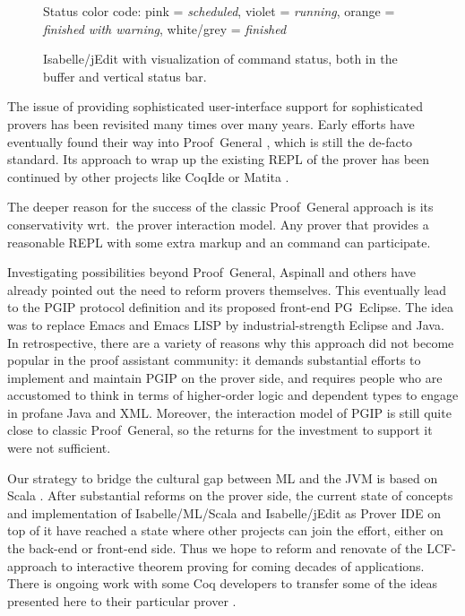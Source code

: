 \begin{isabellebody}
\begin{isamarkuptext}
\begin{figure}[htb]
  {\small Status color code: pink = \emph{scheduled}, violet =
  \emph{running}, orange = \emph{finished with warning}, white/grey =
  \emph{finished}}

  \caption{Isabelle/jEdit with visualization of command status, both
  in the buffer and vertical status bar.}\label{fig:parallel_status}

  \end{figure}

  The issue of providing sophisticated user-interface support for
  sophisticated provers has been revisited many times over many years.
  Early efforts \cite{Bertot-Thery:1998} have eventually found their
  way into Proof~General \cite{Aspinall:TACAS:2000}, which is still
  the de-facto standard.  Its approach to wrap up the existing REPL of
  the prover has been continued by other projects like CoqIde
  \cite[\S4]{Wiedijk:2006} or Matita \cite{Asperti-et-al:2007}.

  The deeper reason for the success of the classic Proof~General
  approach is its conservativity wrt.\ the prover interaction model.
  Any prover that provides a reasonable REPL with some extra markup
  and an \isa{{\isasymUNDO}} command can participate.

  Investigating possibilities beyond Proof~General, Aspinall and
  others have already pointed out the need to reform provers
  themselves.  This eventually lead to the PGIP protocol definition
  \cite{Aspinall-et-al:2007} and its proposed front-end PG~Eclipse.
  The idea was to replace Emacs and Emacs LISP by industrial-strength
  Eclipse and Java.  In retrospective, there are a variety of reasons
  why this approach did not become popular in the proof assistant
  community: it demands substantial efforts to implement and maintain
  PGIP on the prover side, and requires people who are accustomed to
  think in terms of higher-order logic and dependent types to engage
  in profane Java and XML.  Moreover, the interaction model of PGIP is
  still quite close to classic Proof~General, so the returns for the
  investment to support it were not sufficient.

  \medskip Our strategy to bridge the cultural gap between ML and the
  JVM is based on Scala \cite{Scala:2004}.  After substantial reforms
  on the prover side, the current state of concepts and implementation
  of Isabelle/ML/Scala and Isabelle/jEdit as Prover IDE on top of it
  have reached a state where other projects can join the effort,
  either on the back-end or front-end side.  Thus we hope to reform
  and renovate of the LCF-approach to interactive theorem proving for
  coming decades of applications.  There is ongoing work with some Coq
  developers to transfer some of the ideas presented here to their
  particular prover \cite{Tassi-Barras:2012}.


\end{isamarkuptext}
\end{isabellebody}
